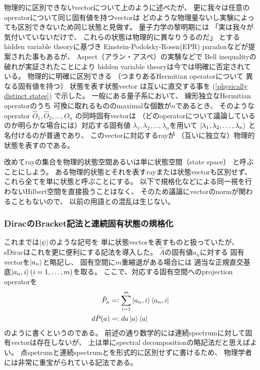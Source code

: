 物理的に区別できないvectorについて上のように述べたが、
更に我々は任意のoperatorについて同じ固有値を持つvectorは
どのような物理量ないし実験によっても区別できないため同じ状態と見做す。
量子力学の黎明期には
「実は我々が気付いていないだけで、
これらの状態は物理的に異なりうるのだ」
とするhidden variable theoryに基づき
Einstein-Podolsky-Rosen(EPR) paradoxなどが提案された事もあるが、
Aspect（アラン・アスペ）の実験などで
Bell inequalityの破れが実証されたことにより
hidden variable theoryは今では明確に否定されている。
物理的に明確に区別できる
（つまりあるHermitian operatorについて
異なる固有値を持つ）
状態を表す状態vector
は互いに直交する事を
(\ref{physically distinct states})
で示した。
一般にある量子系において、
線形独立なHermitian operatorのうち
可換に取れるもののmaximalな個数が$n$であるとき、
そのようなoperator
$\hat{O}_1,\hat{O}_2,\dots,\hat{O}_n$
の同時固有vectorは
（どのoperatorについて議論しているのか明らかな場合には）対応する固有値
$\lambda_1, \lambda_2, \dots , \lambda_n$を用いて
$\ket{\lambda_1, \lambda_2, \dots , \lambda_n}$
と名付けるのが普通であり、
このvectorに対応するrayが
（互いに独立な）物理的状態を表すのである。

改めてrayの集合を物理的状態空間あるいは単に状態空間（state space）
と呼ぶことにしよう。
ある物理的状態とそれを表すrayまたは状態vectorも区別せず、
これら全てを単に状態と呼ぶことにする。
以下で規格化などによる同一視を行わないHilbert空間を直接扱うことはなく、
そのため議論にvectorのnormが関わることもないので、
以前の用語との混乱は生じない。

\subsubsection{DiracのBracket記法と連続固有状態の規格化}

これまでは$\ket{\psi}$のような記号を
単に状態vectorを表すものと扱っていたが、
sDiracはこれを更に便利にする記法を導入した。
$\hat{A}$の固有値$a_n$に対する
固有vectorを$\ket{a_n}$と略記し、
固有空間に$m$重縮退がある場合には
適当な正規直交基底$\ket{a_n,i}(i=1,\dots,m)$を取る。
ここで、対応する固有空間へのprojection operatorを
\begin{align}
    \hat{P}_n &=: \sum_{i=1}^m \ket{a_n,i}\bra{a_n,i}
\\
    d \hat{P}(a) &=: da \ket{a}\bra{a}
\label{projection operator for continuous spectrum}
\end{align}
のように書くというのである。
前述の通り数学的には連続spectrumに対して固有vectorは存在しないが、
上は単にspectral decompositionの略記法だと思えばよい。
点spetrumと連続spectrumとを形式的に区別せずに書けるため、
物理学者には非常に重宝がられている記法である。


